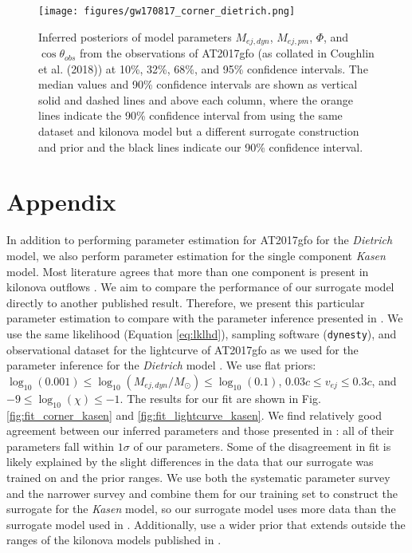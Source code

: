\documentclass[fleqn,usenatbib,useAMS]{mnras}
\begin{document}
\begin{figure*}
    \centering
    \texttt{[image: figures/gw170817\_corner\_dietrich.png]}
    \caption{Inferred posteriors of model parameters  $M_{ej, dyn}$, $M_{ej, pm}$, $\Phi$, and $\cos \theta_{obs}$ from the observations of AT2017gfo (as collated in Coughlin et al. (2018)) at 10\%, 32\%, 68\%, and 95\% confidence intervals. The median values and 90\% confidence intervals are shown as vertical solid and dashed lines and above each column, where the orange lines indicate the 90\% confidence interval from   \protect\cite{dietrichMultimessengerConstraintsNeutronstar2020} using the same dataset and kilonova model but a different surrogate construction and prior and the black lines indicate our 90\% confidence interval.}
    \label{fig:fit_corner}
\end{figure*}






\section*{Appendix}
In addition to performing parameter estimation for AT2017gfo for the \emph{Dietrich} model, we also perform parameter estimation for the single component \emph{Kasen} model.
Most literature agrees that more than one component is present in kilonova outflows \citep{raaijmakersChallengesAheadMultimessenger2021, dietrichModelingDynamicalEjecta2017, kasenOPACITIESSPECTRATHErPROCESS2013, coughlinConstraintsNeutronStar2018}.
We aim to compare the performance of our surrogate model directly to another published result.
Therefore, we present this particular parameter estimation to compare with the parameter inference presented in \cite{coughlinConstraintsNeutronStar2018}.
We use the same likelihood (Equation \ref{eq:lklhd}), sampling software (\texttt{dynesty}), and observational dataset for the lightcurve of AT2017gfo as we used for the parameter inference for the \emph{Dietrich} model  \citep{speagleDynestyDynamicNested2020b}.
We use flat priors: $\log_{10}(0.001) \leq \log_{10}(M_{ej, dyn} / M_{\odot}) \leq \log_{10}(0.1)$, $0.03c \leq v_{ej} \leq 0.3c$, and $-9 \leq  \log_{10}(\chi) \leq -1$.
The results for our fit are shown in Fig.~ \ref{fig:fit_corner_kasen} and \ref{fig:fit_lightcurve_kasen}.
We find relatively good agreement between our inferred parameters and those presented in \cite{coughlinConstraintsNeutronStar2018}: all of their parameters fall within $1\sigma$ of our parameters.
Some of the disagreement in fit is likely explained by the slight differences in the data that our surrogate was trained on and the prior ranges.
We use both the systematic parameter survey and the narrower survey and combine them for our training set to construct the surrogate for the \emph{Kasen} model, so our surrogate model uses more data than the surrogate model used in \cite{coughlinConstraintsNeutronStar2018}.
Additionally, \cite{coughlinConstraintsNeutronStar2018} use a wider prior that extends outside the ranges of the kilonova models published in \cite{kasenOriginHeavyElements2017}.
\end{document}
